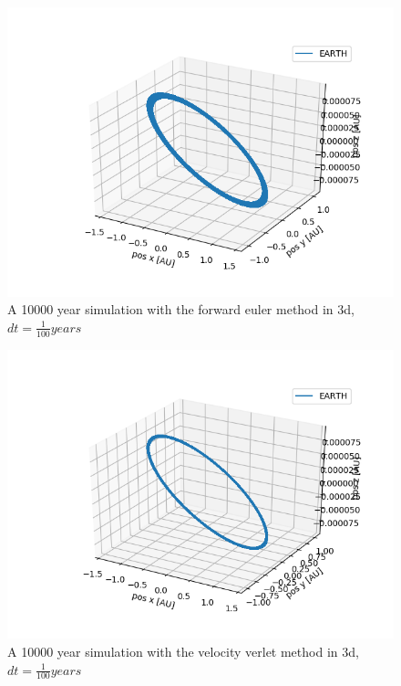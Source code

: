 \documentclass[a4paper]{article}
\begin{document}
\begin{figure}[h!]
	\centering 
	\includegraphics[scale=0.7]{fe1e4_3d.png}
	\caption{A 10000 year simulation with the forward euler method in 3d, $dt = \frac{1}{100}years$}
	\label{fe3d}
\end{figure}

\begin{figure}[h!]
	\centering 
	\includegraphics[scale=0.7]{vv1e4_3d.png}
	\caption{A 10000 year simulation with the velocity verlet method in 3d, $dt = \frac{1}{100}years$}
	\label{vv3d}
\end{figure}
\end{document}
